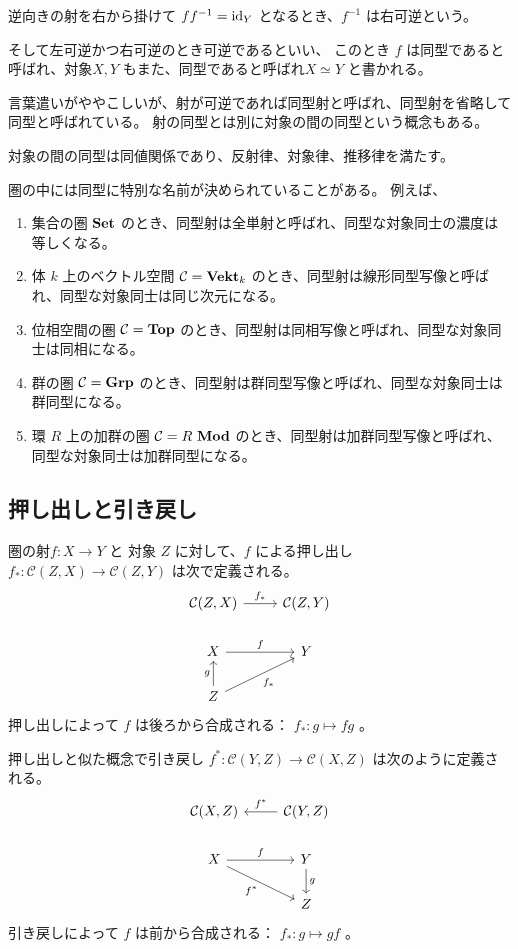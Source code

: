 \documentclass[uplatex,a4j,12pt,dvipdfmx]{jsarticle}
\begin{document}
逆向きの射を右から掛けて $ff^{-1} = {\rm id}_{Y}$ となるとき、$f^{-1}$ は右可逆という。

そして左可逆かつ右可逆のとき可逆であるといい、
このとき $f$ は同型であると呼ばれ、対象$X, Y$ もまた、同型であると呼ばれ$X \simeq Y$ と書かれる。

言葉遣いがややこしいが、射が可逆であれば同型射と呼ばれ、同型射を省略して同型と呼ばれている。
射の同型とは別に対象の間の同型という概念もある。

対象の間の同型は同値関係であり、反射律、対象律、推移律を満たす。

圏の中には同型に特別な名前が決められていることがある。
例えば、

\begin{enumerate}
    \item 集合の圏 ${\bf Set}$ のとき、同型射は全単射と呼ばれ、同型な対象同士の濃度は等しくなる。
    \item 体 $k$ 上のベクトル空間 ${\mathcal C} = {\bf Vekt}_{k}$ のとき、同型射は線形同型写像と呼ばれ、同型な対象同士は同じ次元になる。
    \item 位相空間の圏 ${\mathcal C} = {\bf Top}$ のとき、同型射は同相写像と呼ばれ、同型な対象同士は同相になる。
    \item 群の圏 ${\mathcal C} = {\bf Grp}$ のとき、同型射は群同型写像と呼ばれ、同型な対象同士は群同型になる。
    \item 環 $R$ 上の加群の圏 ${\mathcal C} = R \ {\bf Mod}$ のとき、同型射は加群同型写像と呼ばれ、同型な対象同士は加群同型になる。
\end{enumerate}

\subsection{押し出しと引き戻し}

圏の射$f : X \to Y$ と 対象 $Z$ に対して、$f$ による押し出し $f_{*} : \mathcal{C}(Z,X) \to \mathcal{C}(Z,Y)$ は次で定義される。
\[
\begin{tikzcd}
\mathcal{C}(Z,X) \arrow[r,"f_{*}"] & \mathcal{C}(Z,Y) \\
X \arrow[r,"f"] & Y \\
Z \arrow[u,"g"] \arrow[ur,"f_{*}"'] &
\end{tikzcd}
\]
押し出しによって $f$ は後ろから合成される： $f_{*} : g \mapsto fg$ 。

押し出しと似た概念で引き戻し $f^{*} :\mathcal{C}(Y,Z) \to \mathcal{C}(X,Z)$ は次のように定義される。
\[
\begin{tikzcd}
\mathcal{C}(X,Z) & \mathcal{C}(Y,Z) \arrow[l,"f^{*}"'] \\
X \arrow[r,"f"] \arrow[dr,"f^{*}"'] & Y \arrow[d,"g"] \\
& Z
\end{tikzcd}
\]
引き戻しによって $f$ は前から合成される： $f_{*} : g \mapsto gf$ 。
\end{document}
